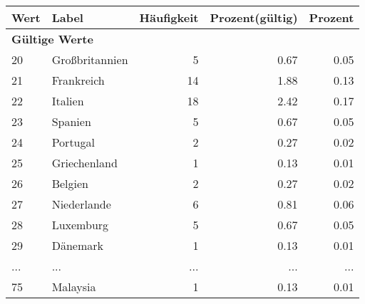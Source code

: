      \begin{longtable}{lXrrr}
     \toprule
     \textbf{Wert} & \textbf{Label} & \textbf{Häufigkeit} & \textbf{Prozent(gültig)} & \textbf{Prozent} \\
     \endhead
     \midrule
     \multicolumn{5}{l}{\textbf{Gültige Werte}}\\
        20 & \multicolumn{1}{X}{Großbritannien} & %
          \num{5} &
          \num[round-mode=places,round-precision=2]{0.67} &
          \num[round-mode=places,round-precision=2]{0.05} \\
        21 & \multicolumn{1}{X}{Frankreich} & %
          \num{14} &
          \num[round-mode=places,round-precision=2]{1.88} &
          \num[round-mode=places,round-precision=2]{0.13} \\
        22 & \multicolumn{1}{X}{Italien} & %
          \num{18} &
          \num[round-mode=places,round-precision=2]{2.42} &
          \num[round-mode=places,round-precision=2]{0.17} \\
        23 & \multicolumn{1}{X}{Spanien} & %
          \num{5} &
          \num[round-mode=places,round-precision=2]{0.67} &
          \num[round-mode=places,round-precision=2]{0.05} \\
        24 & \multicolumn{1}{X}{Portugal} & %
          \num{2} &
          \num[round-mode=places,round-precision=2]{0.27} &
          \num[round-mode=places,round-precision=2]{0.02} \\
        25 & \multicolumn{1}{X}{Griechenland} & %
          \num{1} &
          \num[round-mode=places,round-precision=2]{0.13} &
          \num[round-mode=places,round-precision=2]{0.01} \\
        26 & \multicolumn{1}{X}{Belgien} & %
          \num{2} &
          \num[round-mode=places,round-precision=2]{0.27} &
          \num[round-mode=places,round-precision=2]{0.02} \\
        27 & \multicolumn{1}{X}{Niederlande} & %
          \num{6} &
          \num[round-mode=places,round-precision=2]{0.81} &
          \num[round-mode=places,round-precision=2]{0.06} \\
        28 & \multicolumn{1}{X}{Luxemburg} & %
          \num{5} &
          \num[round-mode=places,round-precision=2]{0.67} &
          \num[round-mode=places,round-precision=2]{0.05} \\
        29 & \multicolumn{1}{X}{Dänemark} & %
          \num{1} &
          \num[round-mode=places,round-precision=2]{0.13} &
          \num[round-mode=places,round-precision=2]{0.01} \\
       ... & ... & ... & ... & ... \\
        75 & \multicolumn{1}{X}{Malaysia} & %
          \num{1} &
          \num[round-mode=places,round-precision=2]{0.13} &
          \num[round-mode=places,round-precision=2]{0.01} \\


\end{longtable}
